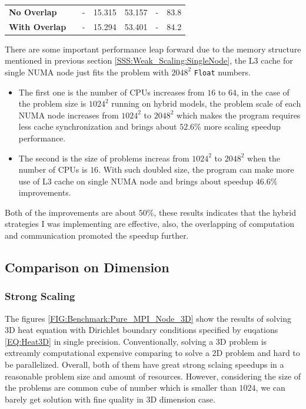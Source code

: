 \begin{table}[htbp]
\begin{minipage}{\columnwidth}
\begin{center}
\begin{tabular}{>{\bfseries}p{3cm} p{1.5cm} p{1.5cm} p{1.5cm} p{1.5cm} p{1.5cm} p{1cm}}
        No Overlap    &                               &   -    & 15.315  & 53.157   &   -                                        & 83.8 \\
        With Overlap  &                               &   -    & 15.294  & 53.401   &   -                                        & 84.2 \\
        \bottomrule
      \end{tabular}
    \end{center}
  \end{minipage}
\end{table}

There are some important performance leap forward 
due to the memory structure mentioned in previous section \ref{SSS:Weak_Scaling:SingleNode}, the L3 cache for single NUMA node 
just fits the problem with $2048^2$ \texttt{Float} numbers.
\begin{itemize}
  \item The first one is the number of CPUs increases from $16$ to $64$, in the case of the problem size is $1024^2$ running on hybrid models, 
  the problem scale of each NUMA node increases from $1024^2$ to $2048^2$ which makes the program requires less cache synchronization 
  and brings about $52.6\%$ more scaling speedup performance.
  \item The second is the size of problems increas from $1024^2$ to $2048^2$ when the number of CPUs is $16$.
  With such doubled size, the program can make more use of L3 cache on single NUMA node and brings about speedup $46.6\%$ improvements. 
\end{itemize}
Both of the improvements are about $50\%$, these results indicates that the hybrid strategies I was implementing are effective, 
also, the overlapping of computation and communication promoted the 
speedup further.








\subsection{Comparison on Dimension}
\subsubsection{Strong Scaling}
The figures \ref{FIG:Benchmark:Pure_MPI_Node_3D} show the results of solving 3D heat equation with Dirichlet boundary conditions 
specified by euqations \ref{EQ:Heat3D} in single precision.
Conventionally, solving a 3D problem is extreamly computational expensive comparing to solve a 2D problem and hard to be parallelized.
Overall, both of them have great strong sclaing speedups in a reasonable problem size and amount of resources.
However, considering the size of the problems are common cube of number which is smaller than $1024$, 
we can barely get solution with fine quality in 3D dimension case.

